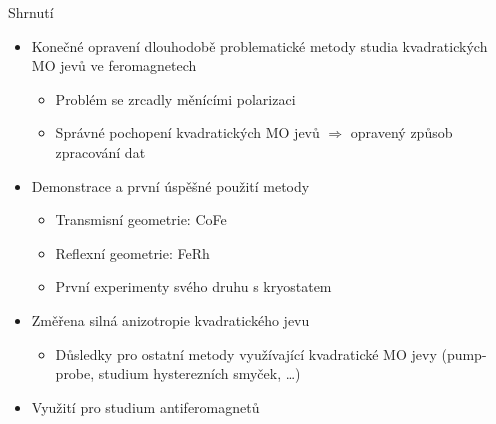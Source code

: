 \documentclass{beamer}
\begin{document}
\begin{frame}{Shrnutí}
    \begin{itemize}
        \item Konečné opravení dlouhodobě problematické metody studia kvadratických MO jevů ve feromagnetech
            \begin{itemize}
                \item Problém se zrcadly měnícími polarizaci
                \item Správné pochopení kvadratických MO jevů $\Rightarrow$ opravený způsob zpracování dat
            \end{itemize}
            \pause
        \item Demonstrace a první úspěšné použití metody
            \begin{itemize}
                \item Transmisní geometrie: CoFe
                \item Reflexní geometrie: FeRh
                \item První experimenty svého druhu s kryostatem
            \end{itemize}
            \pause
        \item Změřena silná anizotropie kvadratického jevu
            \begin{itemize}
                \item Důsledky pro ostatní metody využívající kvadratické MO jevy (pump-probe, studium hysterezních smyček, \ldots)
            \end{itemize}
            \pause
        \item Využití pro studium antiferomagnetů
    \end{itemize}
\end{frame}


\end{document}
